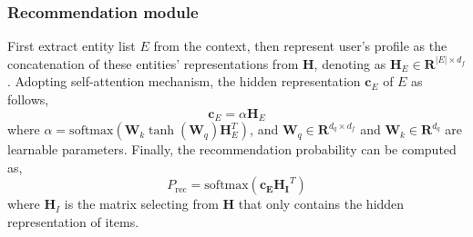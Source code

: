 \documentclass[11pt]{article}
\begin{document}
\subsubsection{Recommendation module}
First extract entity list $E$ from the context, then represent user's profile as the concatenation of these entities' representations from $\mathbf{H}$, denoting as $\mathbf{H}_E \in \mathbf{R}^{|E|\times d_f}$. Adopting self-attention mechanism, the hidden representation $\mathbf{c}_E$ of $E$ as follows,
\begin{equation}
    \mathbf{c}_E = \alpha \mathbf{H}_E
\end{equation}
where $\alpha = \text{softmax}(\mathbf{W}_k \tanh(\mathbf{W}_q)\mathbf{H}_E^T )$, and $\mathbf{W}_q \in \mathbf{R}^{d_q \times d_f}$ and $\mathbf{W}_k \in \mathbf{R}^{d_q}$ are learnable parameters. Finally, the recommendation probability can be computed as,
\begin{equation}
    P_{\text{rec}} = \text{softmax}({\mathbf{c_EH_I}^T})
\end{equation}
where $\mathbf{H}_I$ is the matrix selecting from $\mathbf{H}$ that only contains the hidden representation of items.
\end{document}
